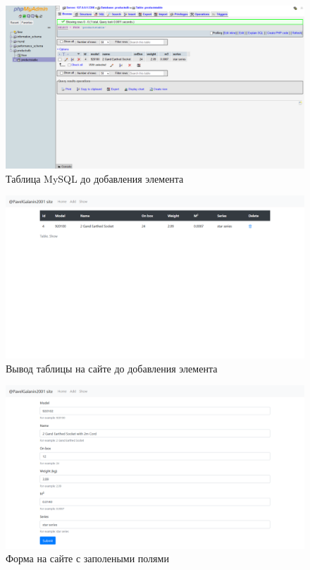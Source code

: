 \begin{figure}[!htp]
    \begin{center}
        \includegraphics[width=12cm]{../_input/tests/mysql_table_before.png}
    \end{center}
    \caption{Таблица MySQL до добавления элемента\label{fig:mysql_table_before}}
\end{figure}

\begin{figure}[!htp]
    \begin{center}
        \includegraphics[width=12cm]{../_input/tests/site_table_before.png}
    \end{center}
    \caption{Вывод таблицы на сайте до добавления элемента\label{fig:site_table_before}}
\end{figure}

\begin{figure}[!htp]
    \begin{center}
        \includegraphics[width=12cm]{../_input/tests/site_form_add_element_to_table.png}
    \end{center}
    \caption{Форма на сайте с заполеными полями\label{fig:site_form_add_element_to_table}}
\end{figure}


